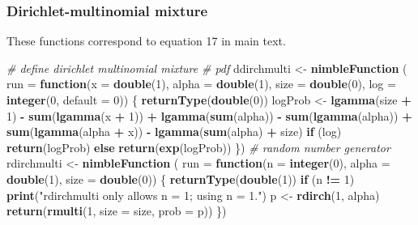 \documentclass[
]{article}
\newenvironment{Shaded}{\begin{snugshade}}{\end{snugshade}}
\newcommand{\AttributeTok}[1]{\textcolor[rgb]{0.13,0.29,0.53}{#1}}
\newcommand{\CommentTok}[1]{\textcolor[rgb]{0.56,0.35,0.01}{\textit{#1}}}
\newcommand{\ControlFlowTok}[1]{\textcolor[rgb]{0.13,0.29,0.53}{\textbf{#1}}}
\newcommand{\DecValTok}[1]{\textcolor[rgb]{0.00,0.00,0.81}{#1}}
\newcommand{\FunctionTok}[1]{\textcolor[rgb]{0.13,0.29,0.53}{\textbf{#1}}}
\newcommand{\NormalTok}[1]{#1}
\newcommand{\OtherTok}[1]{\textcolor[rgb]{0.56,0.35,0.01}{#1}}
\newcommand{\SpecialCharTok}[1]{\textcolor[rgb]{0.81,0.36,0.00}{\textbf{#1}}}
\newcommand{\StringTok}[1]{\textcolor[rgb]{0.31,0.60,0.02}{#1}}
\begin{document}
\subsubsection{Dirichlet-multinomial
mixture}\label{dirichlet-multinomial-mixture}

These functions correspond to equation 17 in main text.

\begin{Shaded}
\begin{Highlighting}[]
\CommentTok{\# define dirichlet multinomial mixture}
\CommentTok{\# pdf}
\NormalTok{ddirchmulti }\OtherTok{\textless{}{-}} \FunctionTok{nimbleFunction}\NormalTok{ (}
  \AttributeTok{run =} \ControlFlowTok{function}\NormalTok{(}\AttributeTok{x =} \FunctionTok{double}\NormalTok{(}\DecValTok{1}\NormalTok{), }\AttributeTok{alpha =} \FunctionTok{double}\NormalTok{(}\DecValTok{1}\NormalTok{), }\AttributeTok{size =} \FunctionTok{double}\NormalTok{(}\DecValTok{0}\NormalTok{),}
                 \AttributeTok{log =} \FunctionTok{integer}\NormalTok{(}\DecValTok{0}\NormalTok{, }\AttributeTok{default =} \DecValTok{0}\NormalTok{)) \{}
    \FunctionTok{returnType}\NormalTok{(}\FunctionTok{double}\NormalTok{(}\DecValTok{0}\NormalTok{))}
\NormalTok{    logProb }\OtherTok{\textless{}{-}} \FunctionTok{lgamma}\NormalTok{(size }\SpecialCharTok{+} \DecValTok{1}\NormalTok{) }\SpecialCharTok{{-}} \FunctionTok{sum}\NormalTok{(}\FunctionTok{lgamma}\NormalTok{(x }\SpecialCharTok{+} \DecValTok{1}\NormalTok{)) }\SpecialCharTok{+} \FunctionTok{lgamma}\NormalTok{(}\FunctionTok{sum}\NormalTok{(alpha)) }\SpecialCharTok{{-}}
      \FunctionTok{sum}\NormalTok{(}\FunctionTok{lgamma}\NormalTok{(alpha)) }\SpecialCharTok{+} \FunctionTok{sum}\NormalTok{(}\FunctionTok{lgamma}\NormalTok{(alpha }\SpecialCharTok{+}\NormalTok{ x)) }\SpecialCharTok{{-}}
      \FunctionTok{lgamma}\NormalTok{(}\FunctionTok{sum}\NormalTok{(alpha) }\SpecialCharTok{+}\NormalTok{ size)}
    \ControlFlowTok{if}\NormalTok{ (log) }\FunctionTok{return}\NormalTok{(logProb)}
    \ControlFlowTok{else} \FunctionTok{return}\NormalTok{(}\FunctionTok{exp}\NormalTok{(logProb))}
\NormalTok{  \})}
\CommentTok{\# random number generator}
\NormalTok{rdirchmulti }\OtherTok{\textless{}{-}} \FunctionTok{nimbleFunction}\NormalTok{ (}
  \AttributeTok{run =} \ControlFlowTok{function}\NormalTok{(}\AttributeTok{n =} \FunctionTok{integer}\NormalTok{(}\DecValTok{0}\NormalTok{), }\AttributeTok{alpha =} \FunctionTok{double}\NormalTok{(}\DecValTok{1}\NormalTok{), }\AttributeTok{size =} \FunctionTok{double}\NormalTok{(}\DecValTok{0}\NormalTok{)) \{}
    \FunctionTok{returnType}\NormalTok{(}\FunctionTok{double}\NormalTok{(}\DecValTok{1}\NormalTok{))}
    \ControlFlowTok{if}\NormalTok{ (n }\SpecialCharTok{!=} \DecValTok{1}\NormalTok{) }\FunctionTok{print}\NormalTok{(}\StringTok{"rdirchmulti only allows n = 1; using n = 1."}\NormalTok{)}
\NormalTok{    p }\OtherTok{\textless{}{-}} \FunctionTok{rdirch}\NormalTok{(}\DecValTok{1}\NormalTok{, alpha)}
    \FunctionTok{return}\NormalTok{(}\FunctionTok{rmulti}\NormalTok{(}\DecValTok{1}\NormalTok{, }\AttributeTok{size =}\NormalTok{ size, }\AttributeTok{prob =}\NormalTok{ p))}
\NormalTok{  \})}
\end{Highlighting}
\end{Shaded}
\end{document}
